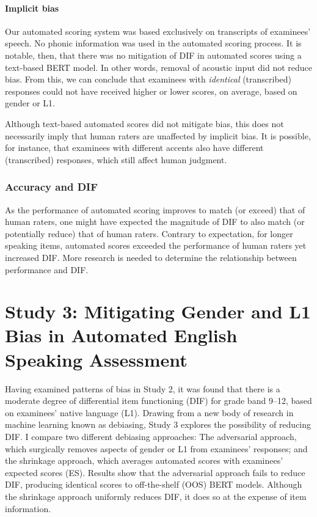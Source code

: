 \documentclass [PhD] {uclathes}
\begin{document}
\subsubsection{Implicit bias}

Our automated scoring system was based exclusively on transcripts of examinees’ speech. No phonic information was used in the automated scoring process. It is notable, then, that there was no mitigation of DIF in automated scores using a text-based BERT model. In other words, removal of acoustic input did not reduce bias. From this, we can conclude that examinees with \emph{identical} (transcribed) responses could not have received higher or lower scores, on average, based on gender or L1. 

Although text-based automated scores did not mitigate bias, this does not necessarily imply that human raters are unaffected by implicit bias. It is possible, for instance, that examinees with different accents also have different (transcribed) responses, which still affect human judgment. 

\subsection{Accuracy and DIF}

As the performance of automated scoring improves to match (or exceed) that of human raters, one might have expected the magnitude of DIF to also match (or potentially reduce) that of human raters. Contrary to expectation, for longer speaking items, automated scores exceeded the performance of human raters yet increased DIF. More research is needed to determine the relationship between performance and DIF. 



\chapter{Study 3: Mitigating Gender and L1 Bias in Automated English Speaking Assessment}

Having examined patterns of bias in Study 2, it was found that there is a moderate degree of differential item functioning (DIF) for grade band 9–12, based on examinees’ native language (L1). Drawing from a new body of research in machine learning known as debiasing, Study 3 explores the possibility of reducing DIF. I compare two different debiasing approaches: The adversarial approach, which surgically removes aspects of gender or L1 from examinees’ responses; and the shrinkage approach, which averages automated scores with examinees’ expected scores (ES). Results show that the adversarial approach fails to reduce DIF, producing identical scores to off-the-shelf (OOS) BERT models. Although the shrinkage approach uniformly reduces DIF, it does so at the expense of item information. 
\end{document}
